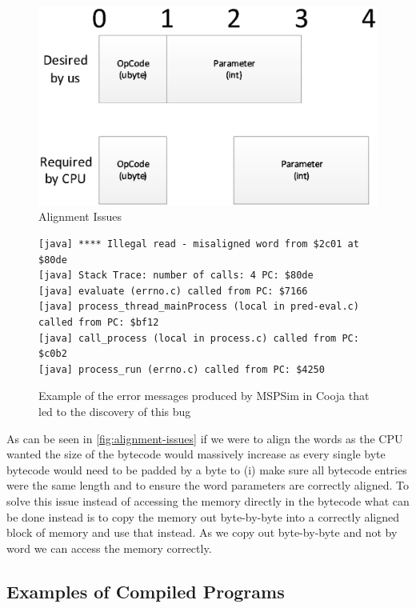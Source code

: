 \begin{figure}[ht!]
\centering
\includegraphics[scale=0.75]{Diagrams/byte-alignment.eps}
\caption{Alignment Issues}
\label{fig:alignment-issues}
\end{figure}

\begin{figure}[ht!]
\begin{verbatim}
[java] **** Illegal read - misaligned word from $2c01 at $80de
[java] Stack Trace: number of calls: 4 PC: $80de
[java] evaluate (errno.c) called from PC: $7166
[java] process_thread_mainProcess (local in pred-eval.c) called from PC: $bf12
[java] call_process (local in process.c) called from PC: $c0b2
[java] process_run (errno.c) called from PC: $4250
\end{verbatim}
\caption{Example of the error messages produced by MSPSim in Cooja that led to the discovery of this bug}
\end{figure}

As can be seen in \autoref{fig:alignment-issues} if we were to align the words as the CPU wanted the size of the bytecode would massively increase as every single byte bytecode would need to be padded by a byte to (i) make sure all bytecode entries were the same length and to ensure the word parameters are correctly aligned. To solve this issue instead of accessing the memory directly in the bytecode what can be done instead is to copy the memory out byte-by-byte into a correctly aligned block of memory and use that instead. As we copy out byte-by-byte and not by word we can access the memory correctly.

\subsection{Examples of Compiled Programs}

